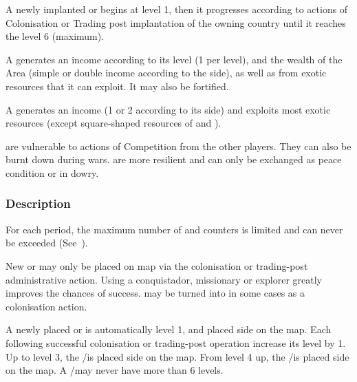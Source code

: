 
A newly implanted \COL or \TP begins at level 1, then it progresses according
to actions of Colonisation or Trading post implantation of the owning country
until it reaches the level 6 (maximum).

A \COL generates an income according to its level (1 \ducats per level), and
the wealth of the Area (simple or double income according to the \COL side),
as well as from exotic resources that it can exploit. It may also be
fortified.


A \TP generates an income (1 or 2 \ducats according to its side) and exploits
most exotic resources (except square-shaped resources of 
and ).

\TP are vulnerable to actions of Competition from the other players. They can
also be burnt down during wars. \COL are more resilient and can only be
exchanged as peace condition or in dowry.


\subsubsection{Description}
 For each period, the maximum number of \COL
and \TP counters is limited and can never be exceeded
(See~).

\aparag[Placement] New \COL or \TP may only be placed on map via the
colonisation or trading-post administrative action.
\bparag Using a conquistador, missionary or explorer greatly improves the
chances of success.
\bparag \TP may be turned into \COL in some cases as a colonisation action.

 A newly placed \COL or \TP is automatically
level 1, and placed side \Facemoins on the map.
\bparag Each following successful colonisation or trading-post operation
increase its level by 1.
\bparag Up to level 3, the \COL/\TP is placed side \Facemoins on the map.
\bparag From level 4 up, the \COL/\TP is placed side \Faceplus on the map.
\bparag A \COL/\TP may never have more than 6 levels.

